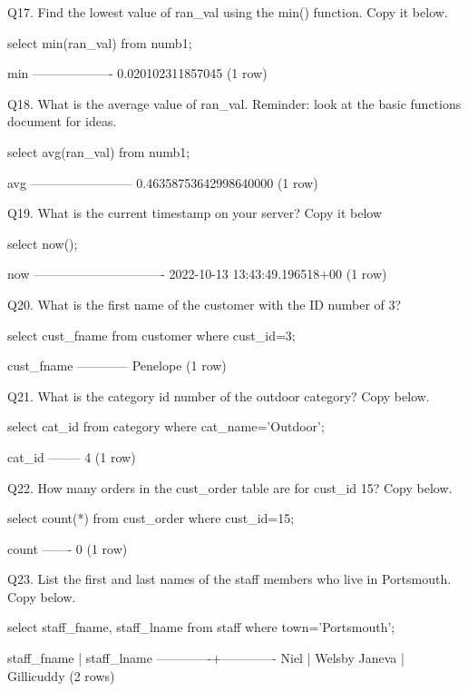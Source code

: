 Q17. Find the lowest value of ran\_val using the min() function. Copy it below.
\begin{sql}
select min(ran_val) from numb1;
\end{sql}
\begin{pseudo*}
        min
-------------------
 0.020102311857045
(1 row)
\end{pseudo*}

Q18. What is the average value of ran\_val. Reminder: look at the basic functions document for ideas.
\begin{sql}
select avg(ran_val) from numb1;
\end{sql}

\begin{pseudo*}
          avg
------------------------
 0.46358753642998640000
(1 row)
\end{pseudo*}

Q19. What is the  current timestamp on your server? Copy it below
\begin{sql}
select now();
\end{sql}
\begin{pseudo*}
              now
-------------------------------
 2022-10-13 13:43:49.196518+00
(1 row)
\end{pseudo*}

Q20. What is the first name of the customer with the ID number of 3?
\begin{sql}
select cust_fname from customer where cust_id=3;
\end{sql}
\begin{pseudo*}
 cust_fname
------------
 Penelope
(1 row)
\end{pseudo*}

Q21. What is the category id number of the outdoor category? Copy below.
\begin{sql}
select cat_id from category where cat_name='Outdoor';
\end{sql}
\begin{pseudo*}
 cat_id
--------
      4
(1 row)
\end{pseudo*}

Q22. How many orders in the cust\_order table are for cust\_id 15? Copy below.
\begin{sql}
select count(*) from cust_order where cust_id=15;
\end{sql}
\begin{pseudo*}
 count
-------
     0
(1 row)
\end{pseudo*}

Q23. List the first and last names of the staff members who live in Portsmouth. Copy below.
\begin{sql}
select staff_fname, staff_lname from staff where town='Portsmouth';
\end{sql}
\begin{pseudo*}
 staff_fname | staff_lname
-------------+-------------
 Niel        | Welsby
 Janeva      | Gillicuddy
(2 rows)
\end{pseudo*}

